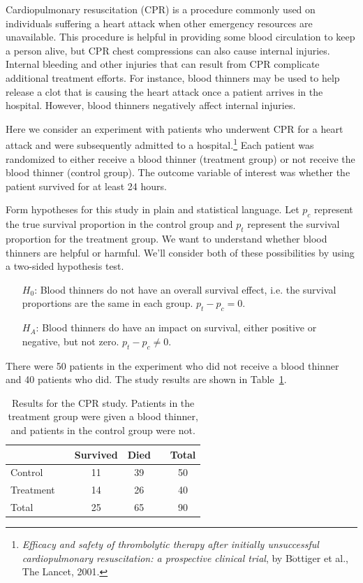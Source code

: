 
Cardiopulmonary resuscitation (CPR) is a procedure commonly used on individuals suffering a heart attack when other emergency resources are unavailable. This procedure is helpful in providing some blood circulation to keep a person alive, but CPR chest compressions can also cause internal injuries. Internal bleeding and other injuries that can result from CPR complicate additional treatment efforts. For instance, blood thinners may be used to help release a clot that is causing the heart attack once a patient arrives in the hospital. However, blood thinners negatively affect internal injuries.

Here we consider an experiment with patients who underwent CPR for a heart attack and were subsequently admitted to a hospital.\footnote{\emph{Efficacy and safety of thrombolytic therapy after initially unsuccessful cardiopulmonary resuscitation: a prospective clinical trial}, by B$\ddot{\text{o}}$ttiger et al., The Lancet, 2001.} Each patient was randomized to either receive a blood thinner (treatment group) or not receive the blood thinner (control group). The outcome variable of interest was whether the patient survived for at least 24 hours.

\begin{example}{Form hypotheses for this study in plain and statistical language. Let $p_c$ represent the true survival proportion in the control group and $p_t$ represent the survival proportion for the treatment group.} \label{hypothesesForCPRStudyInSmallSampleSection}
We want to understand whether blood thinners are helpful or harmful. We'll consider both of these possibilities by using a two-sided hypothesis test.
\begin{itemize}
\item[$H_0$:] Blood thinners do not have an overall survival effect, i.e. the survival proportions are the same in each group. $p_t - p_c = 0$.
\item[$H_A$:] Blood thinners do have an impact on survival, either positive or negative, but not zero. $p_t - p_c \neq 0$.
\end{itemize}
\end{example}

There were 50 patients in the experiment who did not receive a blood thinner and 40 patients who did. The study results are shown in Table~\ref{resultsForCPRStudyInSmallSampleSection}.

\begin{table}[ht]
\centering
\begin{tabular}{lccccc}
\hline
			&& Survived 	& Died 	&& Total \\
\hline
Control		&& 11		& 39		&& 50 \\
Treatment		&& 14		& 26		&& 40 \\
\hline
Total			&& 25		& 65		&& 90 \\
\hline
\end{tabular}
\caption{Results for the CPR study. Patients in the treatment group were given a blood thinner, and patients in the control group were not.}
\label{resultsForCPRStudyInSmallSampleSection}
\end{table}

